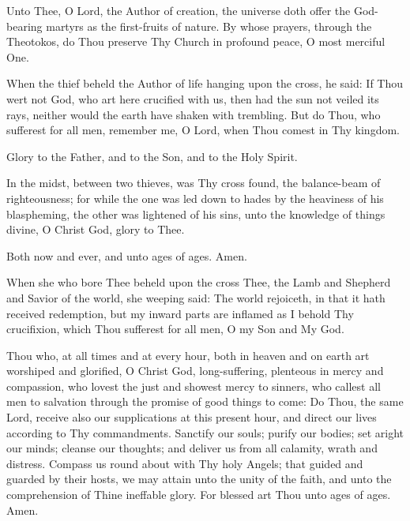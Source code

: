 {

\begin{maybetwocolumns}


Unto Thee, O Lord, the Author of creation, the universe doth offer the God-bearing
martyrs as the first-fruits of nature. By whose prayers, through the Theotokos,
do Thou preserve Thy Church in profound peace, O most merciful One.


When the thief beheld the Author of life hanging upon the cross, he said:
If Thou wert not God, who art here crucified with us,
then had the sun not veiled its rays,
neither would the earth have shaken with trembling.
But do Thou, who sufferest for all men, remember me,
O Lord, when Thou comest in Thy kingdom.

\vbox{}
Glory to the Father, and to the Son, and to the Holy Spirit.

\vbox{}
In the midst, between two thieves, was Thy cross found, the balance-beam of
righteousness; for while the one was led down to hades by the heaviness of his
blaspheming, the other was lightened of his sins,
unto the knowledge of things divine, O Christ God, glory to Thee.

\vbox{}
Both now and ever, and unto ages of ages. Amen.

\vbox{}
When she who bore Thee beheld upon the cross Thee, the Lamb and Shepherd and Savior
of the world, she weeping said: The world rejoiceth, in that it hath received redemption,
but my inward parts are inflamed as I behold Thy crucifixion, which Thou sufferest for all
men, O my Son and My God.


Thou who, at all times and at every hour, both in heaven and on earth art
worshiped and glorified, O Christ God, long-suffering, plenteous in mercy
and compassion, who lovest the just and showest mercy to sinners, who callest
all men to salvation through the promise of good things to come: Do Thou, the
same Lord, receive also our supplications at this present hour, and direct our
lives according to Thy commandments. Sanctify our souls; purify our bodies;
set aright our minds; cleanse our thoughts; and deliver us from all calamity,
wrath and distress. Compass us round about with Thy holy Angels; that
guided and guarded by their hosts, we may attain unto the unity of the faith,
and unto the comprehension of Thine ineffable glory. For blessed art Thou unto
ages of ages. Amen.
\end{maybetwocolumns}

}
